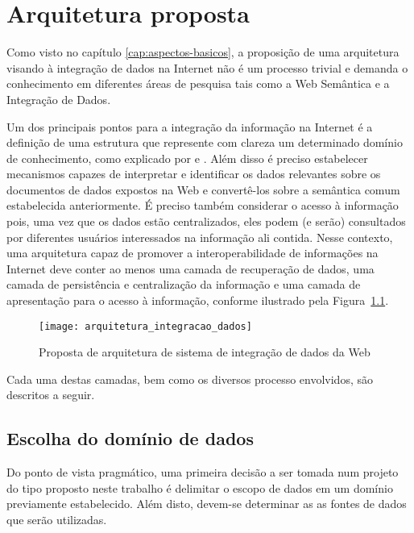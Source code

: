 \chapter{Arquitetura proposta}
\label{cap:modelo}
    
Como visto no capítulo \ref{cap:aspectos-basicos}, a proposição de uma arquitetura visando à integração de dados na Internet não é um processo trivial e demanda o conhecimento em diferentes áreas de pesquisa tais como a Web Semântica e a Integração de Dados.

Um dos principais pontos para a integração da informação na Internet é a definição de uma estrutura que represente com clareza um determinado domínio de conhecimento, como  explicado por \citet{May} e \citet{Ahmed2008}. Além disso é preciso estabelecer mecanismos capazes de interpretar e identificar os dados relevantes sobre os documentos de dados expostos na Web e convertê-los sobre a semântica comum estabelecida anteriormente. É preciso também considerar o acesso à informação pois, uma vez que os dados estão centralizados, eles podem (e serão) consultados por diferentes usuários interessados na informação ali contida. Nesse contexto, uma arquitetura capaz de promover a interoperabilidade de informações na Internet deve conter ao menos uma camada de recuperação de dados, uma camada de persistência e centralização da informação e uma camada de apresentação para o acesso à informação, conforme ilustrado pela Figura~\ref{fig:arquitetura_integracao_dados}.

\begin{figure}[!ht]
  \centering
  \texttt{[image: arquitetura\_integracao\_dados]} 
  \caption{Proposta de arquitetura de sistema de integração de dados da Web}
  \label{fig:arquitetura_integracao_dados} 
\end{figure}

Cada uma destas camadas, bem como os diversos processo envolvidos, são descritos a seguir.

\section{Escolha do domínio de dados}
\label{sec:camada_de_recuperacao_de_dados}

Do ponto de vista pragmático, uma primeira decisão a ser tomada num projeto do tipo proposto neste trabalho é delimitar o escopo de dados em um domínio previamente estabelecido. Além disto, devem-se determinar as as fontes de dados que serão utilizadas.

